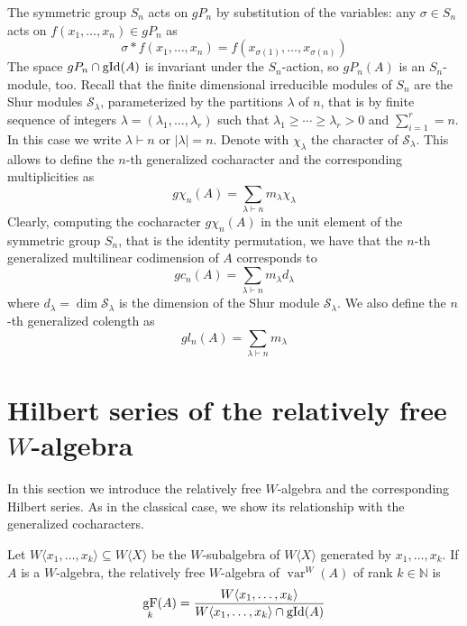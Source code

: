 \documentclass{article}
\newcommand{\WX}{W\langle X\rangle}
\newcommand{\bN}{\mathbb{N}}
\newcommand{\cS}{\mathcal{S}}
\DeclareMathOperator{\gid}{\textnormal{gId}}
\DeclareMathOperator{\var}{var}
\DeclareMathOperator{\F}{gF}
\begin{document}
The symmetric group $S_n$ acts on $gP_n$ by substitution of the variables: any $\sigma\in S_n$ acts on $f(x_1,\dots,x_n)\in gP_n$ as
\[ \sigma \ast f(x_1,\dots,x_n) = f(x_{\sigma(1)},\dots,x_{\sigma(n)}) \]
The space $gP_n\cap \gid(A)$ is invariant under the $S_n$-action, so $gP_n(A)$ is an $S_n$-module, too. Recall that the finite dimensional irreducible modules of $S_n$ are the Shur modules $\cS_\lambda$, parameterized by the partitions $\lambda$ of $n$, that is by finite sequence of integers $\lambda=(\lambda_1,\ldots,\lambda_r)$ such that $\lambda_1 \geq \cdots \geq \lambda_r > 0$ and $\sum_{i=1}^r=n$. In this case we write $\lambda \vdash n$ or $|\lambda|=n$. Denote with $\chi_\lambda$ the character of $\cS_\lambda$.
This allows to define the $n$-th generalized cocharacter and the corresponding multiplicities as 
\begin{equation}\label{eq: gen_cocharacter}
	g\chi_n(A) = \sum_{\lambda\vdash n} m_\lambda \chi_\lambda
\end{equation}
Clearly, computing the cocharacter $g\chi_n(A)$ in the unit element of the symmetric group $S_n$, that is the identity permutation, we have that the $n$-th generalized multilinear codimension of $A$ corresponds to \begin{equation}\label{eq: gen_cod_formula}
	gc_n(A) =  \sum_{\lambda \vdash n}m_\lambda d_\lambda 
\end{equation}
where $d_\lambda= \dim \cS_\lambda$ is the dimension of the Shur module $\cS_\lambda$. We also define the $n$-th generalized colength as
\[ gl_n(A) = \sum_{\lambda \vdash n} m_\lambda \]

\section{Hilbert series of the relatively free $W$-algebra}

In this section we introduce the relatively free $W$-algebra and the corresponding Hilbert series. As in the classical case, we show its relationship with the generalized cocharacters.


Let $W\langle x_1,\dots,x_k\rangle\subseteq\WX$ be the $W$-subalgebra of $\WX$ generated by $x_1,\dots,x_k$. If $A$ is a $W$-algebra, the relatively free $W$-algebra of $\var^W(A)$ of rank $k\in \bN$ is 
\[ \F_k(A)=\frac{W\langle x_1,\dots,x_k\rangle}{W\langle x_1,\dots,x_k\rangle\cap \gid(A)} \]
\end{document}

